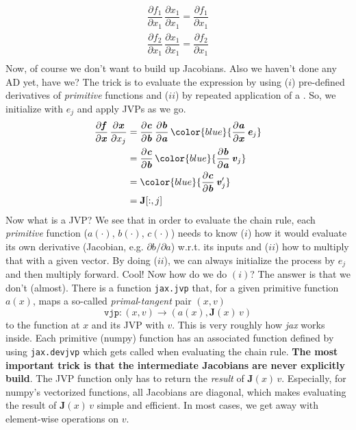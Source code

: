 \documentclass[paper=a4,11pt,headsepline]{scrartcl}
\newcommand{\ve}[1]{\ensuremath{\bm{\mathit{#1}}}}
\newcommand{\ma}[1]{\ensuremath{\bm{\mathbf{#1}}}}
\newcommand{\ra}{\ensuremath{\rightarrow}}
\newcommand{\pd}[2]{\dfrac{\partial #1}{\partial #2}}
\newcommand{\pdi}[2]{\partial #1/\partial #2}
\newcommand{\blue}[1]{{\color{blue}{#1}}}
\newcommand{\soft}[1]{\textsl{#1}\xspace}
\newcommand{\jax}{\soft{jax}}
\begin{document}
\begin{gather*}
    \pd{f_1}{x_1}\,\pd{x_1}{x_1} = \pd{f_1}{x_1} \\
    \pd{f_2}{x_1}\,\pd{x_1}{x_1} = \pd{f_2}{x_1} \\
\end{gather*}
Now, of course we don't want to build up Jacobians. Also we haven't done any AD
yet, have we? The trick is to evaluate the expression by using ($i$)
pre-defined derivatives of \emph{primitive} functions and ($ii$) by repeated
application of a \blue{\emph{Jacobian vector product (JVP)}}. So, we initialize
with $\ve e_j$ and apply JVPs as we go.
\begin{align*}
    \pd{\ve f}{\ve x}\,\pd{\ve x}{x_j}
        &= \pd{\ve c}{\ve b}\,\pd{\ve b}{\ve a}\,\blue{\pd{\ve a}{\ve x}\,\ve e_j} \\
        &= \pd{\ve c}{\ve b}\,\blue{\pd{\ve b}{\ve a}\,\ve v_j} \\
        &= \blue{\pd{\ve c}{\ve b}\,\ve v_j'} \\
        &= \ma J[:,j]
\end{align*}
Now what is a JVP? We see that in order to evaluate the chain rule, each
\emph{primitive} function ($\ve a(\cdot)$, $\ve b(\cdot)$, $\ve c(\cdot)$)
needs to know ($i$) how it would evaluate its own derivative (Jacobian, e.g.
$\pdi{\ve b}{\ve a}$) w.r.t. its inputs and ($ii$) how to multiply that with a
given vector. By doing ($ii$), we can always initialize the process by $\ve
e_j$ and then multiply forward. Cool! Now how do we do $(i)$? The answer is
that we don't (almost). There is a function \texttt{jax.jvp} that, for a given
primitive function $\ve a(\ve x)$, maps a so-called
\emph{primal}-\emph{tangent} pair $(\ve x, \ve v)$
\begin{equation*}
    \texttt{vjp}: (\ve x, \ve v) \ra \left(\ve a(\ve x), \ma J(\ve x)\,\ve v\right)
\end{equation*}
to the function at $\ve x$ and its JVP with $\ve v$. This is very roughly how
\jax works inside. Each primitive (numpy) function has an associated
function defined by using \texttt{jax.devjvp} which gets called when evaluating
the chain rule. \textbf{The most important trick is that the intermediate
Jacobians are never explicitly build}. The JVP function only has to return the
\emph{result} of $\ma J(\ve x)\,\ve v$. Especially, for numpy's vectorized
functions, all Jacobians are diagonal, which makes evaluating the result of $\ma J(\ve x)\,\ve v$
simple and efficient. In most cases, we get away with element-wise operations
on \ve v.
\end{document}
